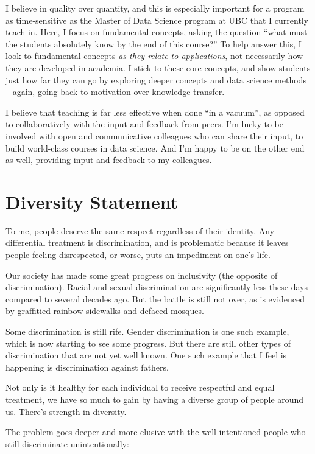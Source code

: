 \documentclass[]{book}
\begin{document}
I believe in quality over quantity, and this is especially important for a program as time-sensitive as the Master of Data Science program at UBC that I currently teach in. Here, I focus on fundamental concepts, asking the question ``what must the students absolutely know by the end of this course?'' To help answer this, I look to fundamental concepts \emph{as they relate to applications}, not necessarily how they are developed in academia. I stick to these core concepts, and show students just how far they can go by exploring deeper concepts and data science methods -- again, going back to motivation over knowledge transfer.

I believe that teaching is far less effective when done ``in a vacuum'', as opposed to collaboratively with the input and feedback from peers. I'm lucky to be involved with open and communicative colleagues who can share their input, to build world-class courses in data science. And I'm happy to be on the other end as well, providing input and feedback to my colleagues.

\hypertarget{diversity-statement}{%
\chapter{Diversity Statement}\label{diversity-statement}}

To me, people deserve the same respect regardless of their identity. Any differential treatment is discrimination, and is problematic because it leaves people feeling disrespected, or worse, puts an impediment on one's life.

Our society has made some great progress on inclusivity (the opposite of discrimination). Racial and sexual discrimination are significantly less these days compared to several decades ago. But the battle is still not over, as is evidenced by graffitied rainbow sidewalks and defaced mosques.

Some discrimination is still rife. Gender discrimination is one such example, which is now starting to see some progress. But there are still other types of discrimination that are not yet well known. One such example that I feel is happening is discrimination against fathers.

Not only is it healthy for each individual to receive respectful and equal treatment, we have so much to gain by having a diverse group of people around us. There's strength in diversity.

The problem goes deeper and more elusive with the well-intentioned people who still discriminate unintentionally:
\end{document}
